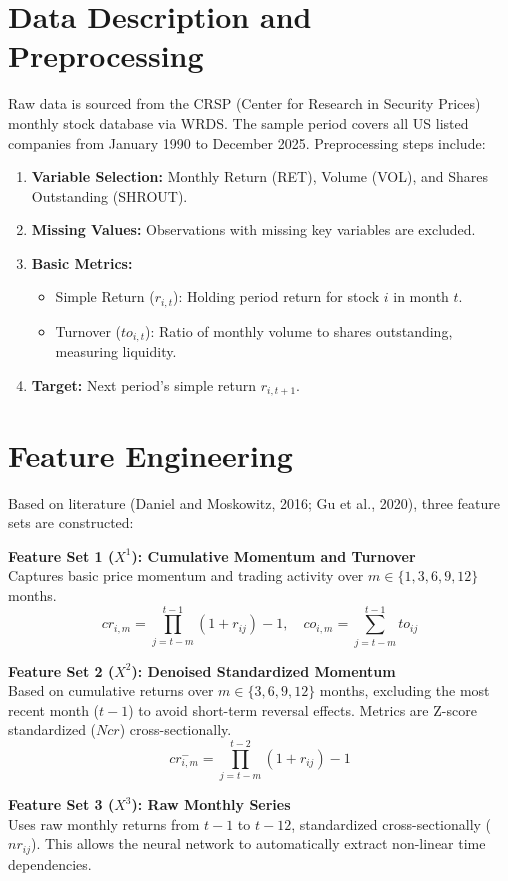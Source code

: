 \documentclass[openany]{book}
\numberwithin{figure}{chapter}
\numberwithin{equation}{chapter}
\begin{document}
\section{Data Description and Preprocessing}
Raw data is sourced from the CRSP (Center for Research in Security Prices) monthly stock database via WRDS. The sample period covers all US listed companies from January 1990 to December 2025. Preprocessing steps include:
\begin{enumerate}
    \item \textbf{Variable Selection:} Monthly Return (RET), Volume (VOL), and Shares Outstanding (SHROUT).
    \item \textbf{Missing Values:} Observations with missing key variables are excluded.
    \item \textbf{Basic Metrics:}
    \begin{itemize}
        \item Simple Return ($r_{i,t}$): Holding period return for stock $i$ in month $t$.
        \item Turnover ($to_{i,t}$): Ratio of monthly volume to shares outstanding, measuring liquidity.
    \end{itemize}
    \item \textbf{Target:} Next period's simple return $r_{i,t+1}$.
\end{enumerate}

\section{Feature Engineering}
Based on literature (Daniel and Moskowitz, 2016; Gu et al., 2020), three feature sets are constructed:

\textbf{Feature Set 1 ($X^1$): Cumulative Momentum and Turnover} \\
Captures basic price momentum and trading activity over $m \in \{1, 3, 6, 9, 12\}$ months.
\[
cr_{i,m} = \prod_{j=t-m}^{t-1} (1+r_{ij})-1, \quad co_{i,m} = \sum_{j=t-m}^{t-1} to_{ij}
\]

\textbf{Feature Set 2 ($X^2$): Denoised Standardized Momentum} \\
Based on cumulative returns over $m \in \{3, 6, 9, 12\}$ months, excluding the most recent month ($t-1$) to avoid short-term reversal effects. Metrics are Z-score standardized ($Ncr$) cross-sectionally.
\[
cr^{-}_{i,m} = \prod_{j=t-m}^{t-2} (1+r_{ij}) - 1
\]

\textbf{Feature Set 3 ($X^3$): Raw Monthly Series} \\
Uses raw monthly returns from $t-1$ to $t-12$, standardized cross-sectionally ($nr_{ij}$). This allows the neural network to automatically extract non-linear time dependencies.
\end{document}
